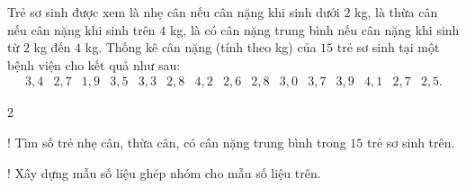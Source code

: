 \begin{ex}%
	Trẻ sơ sinh được xem là nhẹ cân nếu cân nặng khi sinh dưới $2$ kg, là thừa cân nếu cân nặng khi sinh trên $4$ kg, là có cân nặng trung bình nếu cân nặng khi sinh từ $2$ kg đến $4$ kg. Thống kê cân nặng (tính theo kg) của $15$ trẻ sơ sinh tại một bệnh viện cho kết quả như sau: \[\begin{array}{ccccccccccccccc}3{,}4 & 2{,}7 & 1{,}9 & 3{,}5 & 3{,}3 & 2{,}8 & 4{,}2 & 2{,}6 & 2{,}8 & 3{,}0 & 3{,}7 & 3{,}9 & 4{,}1 & 2{,}7 & 2{,}5.
\end{array}\]
\begin{enumEX}{2}
	\item! Tìm số trẻ nhẹ cân, thừa cân, có cân nặng trung bình  trong $15$ trẻ sơ sinh trên.
	\item! Xây dựng  mẫu số liệu ghép nhóm cho mẫu số liệu trên.
\end{enumEX}
\end{ex}

